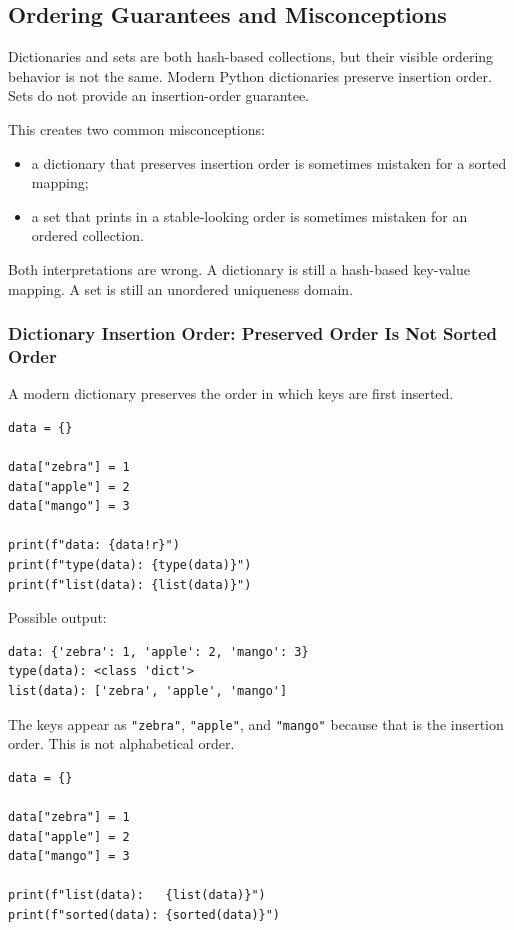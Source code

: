 \subsection{Ordering Guarantees and Misconceptions}

Dictionaries and sets are both hash-based collections, but their visible ordering behavior is not the same. Modern Python dictionaries preserve insertion order. Sets do not provide an insertion-order guarantee.

This creates two common misconceptions:

\begin{itemize}
    \item a dictionary that preserves insertion order is sometimes mistaken for a sorted mapping;
    \item a set that prints in a stable-looking order is sometimes mistaken for an ordered collection.
\end{itemize}

Both interpretations are wrong. A dictionary is still a hash-based key-value mapping. A set is still an unordered uniqueness domain.

\subsubsection{Dictionary Insertion Order: Preserved Order Is Not Sorted Order}

A modern dictionary preserves the order in which keys are first inserted.

\begin{verbatim}
data = {}

data["zebra"] = 1
data["apple"] = 2
data["mango"] = 3

print(f"data: {data!r}")
print(f"type(data): {type(data)}")
print(f"list(data): {list(data)}")
\end{verbatim}

Possible output:

\begin{verbatim}
data: {'zebra': 1, 'apple': 2, 'mango': 3}
type(data): <class 'dict'>
list(data): ['zebra', 'apple', 'mango']
\end{verbatim}

The keys appear as \texttt{"zebra"}, \texttt{"apple"}, and \texttt{"mango"} because that is the insertion order. This is not alphabetical order.

\begin{verbatim}
data = {}

data["zebra"] = 1
data["apple"] = 2
data["mango"] = 3

print(f"list(data):   {list(data)}")
print(f"sorted(data): {sorted(data)}")
\end{verbatim}

